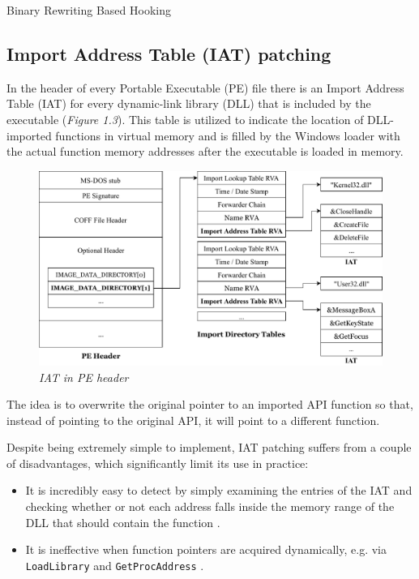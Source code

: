 \documentclass[binding=0.6cm,LaM,english,noexaminfo,oneside]{sapthesis} %
\begin{document}
\begin{section}{Binary Rewriting Based Hooking}
\subsection{Import Address Table (IAT) patching}

In the header of every Portable Executable (PE) file there is an Import Address Table (IAT) for every dynamic-link library (DLL) that is included by the executable \cite{Berdajs:2010:EAU:1815744.1815746} (\textit{Figure 1.3}). This table is utilized to indicate the location of DLL-imported functions in virtual memory and is filled by the Windows loader with the actual function memory addresses after the executable is loaded in memory.

\begin{figure}[h]
\centering
\hspace*{-3em}
\includegraphics[scale=0.8]{Figures/IAT-3.pdf}
\caption{\textit{IAT in PE header}}
\end{figure}

The idea is to overwrite the original pointer to an imported API function so that, instead of pointing to the original API, it will point to a different function.

\newpage

Despite being extremely simple to implement, IAT patching suffers from a couple of disadvantages, which significantly limit its use in practice:
\begin{itemize}
    \item It is incredibly easy to detect by simply examining the entries of the IAT and checking whether or not each address falls inside the memory range of the DLL that should contain the function \cite{HookingDetection}.
    \item It is ineffective when function pointers are acquired dynamically, e.g. via \texttt{LoadLibrary} and \texttt{GetProcAddress} \cite{Buescher:2011:BIS:2186328.2186347}.
\end{itemize}


\end{section}
\end{document}
